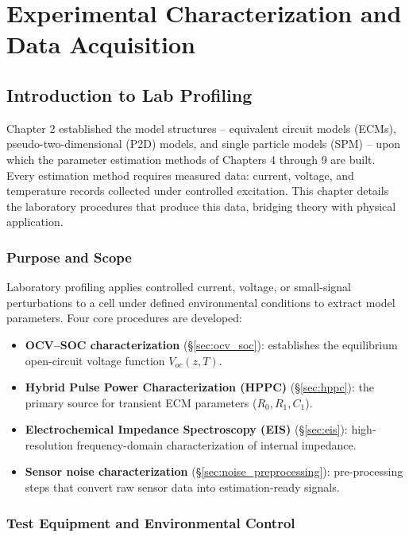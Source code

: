 \chapter{Experimental Characterization and Data Acquisition}
\label{chap:characterization}

\section{Introduction to Lab Profiling}
\label{sec:lab_profiling}

Chapter 2 established the model structures -- equivalent circuit models (ECMs), pseudo-two-dimensional (P2D) models, and single particle models (SPM) -- upon which the parameter estimation methods of Chapters 4 through 9 are built. Every estimation method requires measured data: current, voltage, and temperature records collected under controlled excitation. This chapter details the laboratory procedures that produce this data, bridging theory with physical application.

\subsection{Purpose and Scope}

Laboratory profiling applies controlled current, voltage, or small-signal perturbations to a cell under defined environmental conditions to extract model parameters. Four core procedures are developed:

\begin{itemize}
    \item \textbf{OCV--SOC characterization} (\S\ref{sec:ocv_soc}): establishes the equilibrium open-circuit voltage function $V_{oc}(z,T)$.
    \item \textbf{Hybrid Pulse Power Characterization (HPPC)} (\S\ref{sec:hppc}): the primary source for transient ECM parameters ($R_0, R_1, C_1$).
    \item \textbf{Electrochemical Impedance Spectroscopy (EIS)} (\S\ref{sec:eis}): high-resolution frequency-domain characterization of internal impedance.
    \item \textbf{Sensor noise characterization} (\S\ref{sec:noise_preprocessing}): pre-processing steps that convert raw sensor data into estimation-ready signals.
\end{itemize}

\subsection{Test Equipment and Environmental Control}


